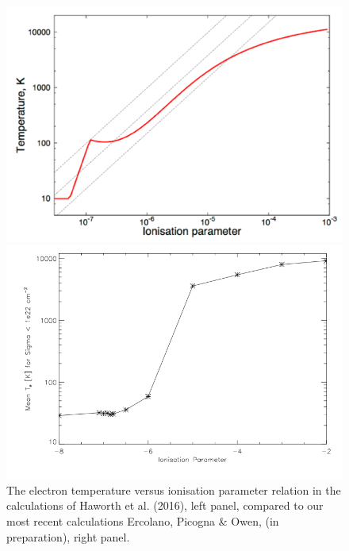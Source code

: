 \documentclass[10pt,fleqn,twoside]{article}
\begin{document}
\begin{figure}
\centering
\begin{minipage}[b]{.47\textwidth}
  \centering
  \includegraphics[width=0.95\linewidth]{xite_a.pdf}
\end{minipage}%
\hspace{0.05\textwidth}
\begin{minipage}[b]{.47\textwidth}
  \centering
  \includegraphics[width=\linewidth]{a.png}
\end{minipage}
\caption{The electron temperature versus ionisation parameter relation
in the calculations of Haworth et al. (2016), left panel, compared to
our most recent calculations Ercolano, Picogna \& Owen, (in
preparation), right panel.}
  \label{fig:xite}
\end{figure}
\end{document}
